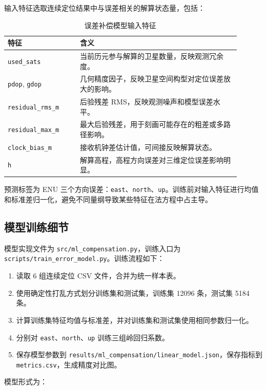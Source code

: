 输入特征选取连续定位结果中与误差相关的解算状态量，包括：

\begin{table}[H]
\centering
\small
\begin{tabular}{p{0.28\linewidth}p{0.62\linewidth}}
\toprule
特征 & 含义 \\
\midrule
\texttt{used\_sats} & 当前历元参与解算的卫星数量，反映观测冗余度。 \\
\texttt{pdop}, \texttt{gdop} & 几何精度因子，反映卫星空间构型对定位误差放大的影响。 \\
\texttt{residual\_rms\_m} & 后验残差 RMS，反映观测噪声和模型误差水平。 \\
\texttt{residual\_max\_m} & 最大后验残差，用于刻画可能存在的粗差或多路径影响。 \\
\texttt{clock\_bias\_m} & 接收机钟差估计值，可间接反映解算状态。 \\
\texttt{h} & 解算高程，高程方向误差对三维定位误差影响明显。 \\
\bottomrule
\end{tabular}
\caption{误差补偿模型输入特征}
\end{table}

预测标签为 ENU 三个方向误差：\texttt{east}、\texttt{north}、\texttt{up}。训练前对输入特征进行均值和标准差归一化，避免不同量纲导致某些特征在法方程中占主导。

\subsection{模型训练细节}

模型实现文件为 \texttt{src/ml\_compensation.py}，训练入口为 \texttt{scripts/train\_error\_model.py}。训练流程如下：

\begin{enumerate}
\item 读取 6 组连续定位 CSV 文件，合并为统一样本表。
\item 使用确定性打乱方式划分训练集和测试集，训练集 12096 条，测试集 5184 条。
\item 计算训练集特征均值与标准差，并对训练集和测试集使用相同参数归一化。
\item 分别对 \texttt{east}、\texttt{north}、\texttt{up} 训练三组岭回归系数。
\item 保存模型参数到 \texttt{results/ml\_compensation/linear\_model.json}，保存指标到 \texttt{metrics.csv}，生成精度对比图。
\end{enumerate}

模型形式为：

